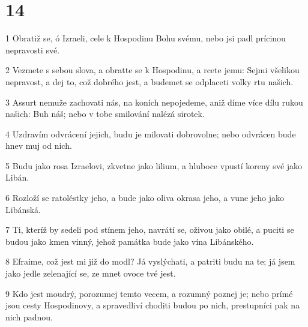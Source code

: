 \chapter{14}

\par 1 Obratiž se, ó Izraeli, cele k Hospodinu Bohu svému, nebo jsi padl prícinou nepravosti své.
\par 2 Vezmete s sebou slova, a obratte se k Hospodinu, a rcete jemu: Sejmi všelikou nepravost, a dej to, což dobrého jest, a budemet se odplaceti volky rtu našich.
\par 3 Assurt nemuže zachovati nás, na koních nepojedeme, aniž díme více dílu rukou našich: Buh náš; nebo v tobe smilování nalézá sirotek.
\par 4 Uzdravím odvrácení jejich, budu je milovati dobrovolne; nebo odvrácen bude hnev muj od nich.
\par 5 Budu jako rosa Izraelovi, zkvetne jako lilium, a hluboce vpustí koreny své jako Libán.
\par 6 Rozloží se ratoléstky jeho, a bude jako oliva okrasa jeho, a vune jeho jako Libánská.
\par 7 Ti, kteríž by sedeli pod stínem jeho, navrátí se, oživou jako obilé, a puciti se budou jako kmen vinný, jehož památka bude jako vína Libánského.
\par 8 Efraime, což jest mi již do modl? Já vyslýchati, a patriti budu na te; já jsem jako jedle zelenající se, ze mnet ovoce tvé jest.
\par 9 Kdo jest moudrý, porozumej temto vecem, a rozumný poznej je; nebo prímé jsou cesty Hospodinovy, a spravedliví choditi budou po nich, prestupníci pak na nich padnou.

